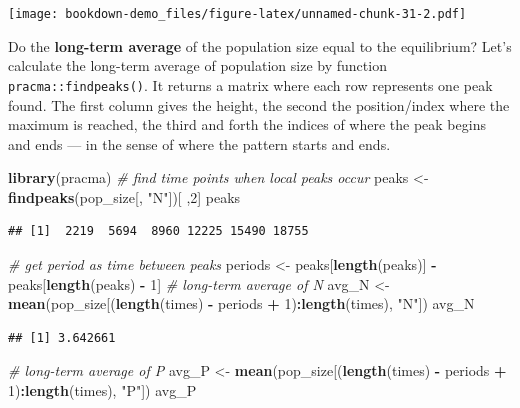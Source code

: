 \documentclass[
]{book}
\newenvironment{Shaded}{\begin{snugshade}}{\end{snugshade}}
\newcommand{\CommentTok}[1]{\textcolor[rgb]{0.56,0.35,0.01}{\textit{#1}}}
\newcommand{\DecValTok}[1]{\textcolor[rgb]{0.00,0.00,0.81}{#1}}
\newcommand{\FunctionTok}[1]{\textcolor[rgb]{0.13,0.29,0.53}{\textbf{#1}}}
\newcommand{\NormalTok}[1]{#1}
\newcommand{\OtherTok}[1]{\textcolor[rgb]{0.56,0.35,0.01}{#1}}
\newcommand{\SpecialCharTok}[1]{\textcolor[rgb]{0.81,0.36,0.00}{\textbf{#1}}}
\newcommand{\StringTok}[1]{\textcolor[rgb]{0.31,0.60,0.02}{#1}}
\begin{document}
\texttt{[image: bookdown-demo\_files/figure-latex/unnamed-chunk-31-2.pdf]}

Do the \textbf{long-term average} of the population size equal to the equilibrium? Let's calculate the long-term average of population size by function \texttt{pracma::findpeaks()}. It returns a matrix where each row represents one peak found. The first column gives the height, the second the position/index where the maximum is reached, the third and forth the indices of where the peak begins and ends --- in the sense of where the pattern starts and ends.

\begin{Shaded}
\begin{Highlighting}[]
\FunctionTok{library}\NormalTok{(pracma)}
\CommentTok{\# find time points when local peaks occur}
\NormalTok{peaks }\OtherTok{\textless{}{-}} \FunctionTok{findpeaks}\NormalTok{(pop\_size[, }\StringTok{"N"}\NormalTok{])[ ,}\DecValTok{2}\NormalTok{]}
\NormalTok{peaks }
\end{Highlighting}
\end{Shaded}

\begin{verbatim}
## [1]  2219  5694  8960 12225 15490 18755
\end{verbatim}

\begin{Shaded}
\begin{Highlighting}[]
\CommentTok{\# get period as time between peaks }
\NormalTok{periods }\OtherTok{\textless{}{-}}\NormalTok{ peaks[}\FunctionTok{length}\NormalTok{(peaks)] }\SpecialCharTok{{-}}\NormalTok{ peaks[}\FunctionTok{length}\NormalTok{(peaks) }\SpecialCharTok{{-}} \DecValTok{1}\NormalTok{]}
\CommentTok{\# long{-}term average of N}
\NormalTok{avg\_N }\OtherTok{\textless{}{-}} \FunctionTok{mean}\NormalTok{(pop\_size[(}\FunctionTok{length}\NormalTok{(times) }\SpecialCharTok{{-}}\NormalTok{ periods }\SpecialCharTok{+} \DecValTok{1}\NormalTok{)}\SpecialCharTok{:}\FunctionTok{length}\NormalTok{(times), }\StringTok{"N"}\NormalTok{])}
\NormalTok{avg\_N}
\end{Highlighting}
\end{Shaded}

\begin{verbatim}
## [1] 3.642661
\end{verbatim}

\begin{Shaded}
\begin{Highlighting}[]
\CommentTok{\# long{-}term average of P}
\NormalTok{avg\_P }\OtherTok{\textless{}{-}} \FunctionTok{mean}\NormalTok{(pop\_size[(}\FunctionTok{length}\NormalTok{(times) }\SpecialCharTok{{-}}\NormalTok{ periods }\SpecialCharTok{+} \DecValTok{1}\NormalTok{)}\SpecialCharTok{:}\FunctionTok{length}\NormalTok{(times), }\StringTok{"P"}\NormalTok{])}
\NormalTok{avg\_P}
\end{Highlighting}
\end{Shaded}
\end{document}
